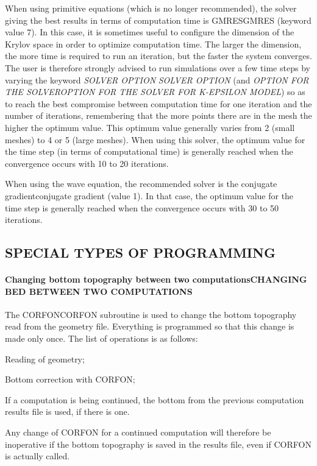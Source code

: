 \documentclass{article} %
\begin{document}
 When using primitive equations (which is no longer recommended), the solver giving the best results in terms of computation time is GMRESGMRES (keyword value 7). In this case, it is sometimes useful to configure the dimension of the Krylov space in order to optimize computation time. The larger the dimension, the more time is required to run an iteration, but the faster the system converges. The user is therefore strongly advised to run simulations over a few time steps by varying the keyword \textit{SOLVER OPTION} \textit{SOLVER OPTION} (and \textit{OPTION FOR THE SOLVEROPTION FOR THE SOLVER FOR K-EPSILON MODEL}) so as to reach the best compromise between computation time for one iteration and the number of iterations, remembering that the more points there are in the mesh the higher the optimum value. This optimum value generally varies from 2 (small meshes) to 4 or 5 (large meshes). When using this solver, the optimum value for the time step (in terms of computational time) is generally reached when the convergence occurs with 10 to 20 iterations.

 When using the wave equation, the recommended solver is the conjugate gradientconjugate gradient (value 1). In that case, the optimum value for the time step is generally reached when the convergence occurs with 30 to 50 iterations.


\subsection{ SPECIAL TYPES OF PROGRAMMING}


\paragraph{ Changing bottom topography between two computationsCHANGING BED BETWEEN TWO COMPUTATIONS}

 The CORFONCORFON subroutine is used to change the bottom topography read from the geometry file. Everything is programmed so that this change is made only once. The list of operations is as follows:

 Reading of geometry;

 Bottom correction with CORFON;

 If a computation is being continued, the bottom from the previous computation results file is used, if there is one.

 Any change of CORFON for a continued computation will therefore be inoperative if the bottom topography is saved in the results file, even if CORFON is actually called.
\end{document}
